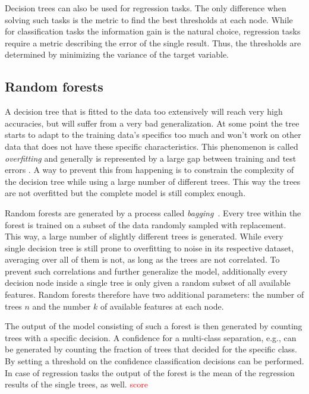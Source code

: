 Decision trees can also be used for regression tasks. The only difference when
solving such tasks is the metric to find the best thresholds at each node.
While for classification tasks the information gain is the natural choice, regression
tasks require a metric describing the error of the single result. Thus, the
thresholds are determined by minimizing the variance of the target variable.

\subsection{Random forests}
%
A decision tree that is fitted to the data too extensively will reach
very high accuracies, but will suffer from a very bad generalization. At some
point the tree starts to adapt to the training data's specifics too much and
won't work on other data that does not have these specific characteristics.
This phenomenon is called \textit{overfitting} and generally is represented by
a large gap between training and test errors \cite{goodfellow}. A way to
prevent this from happening is to constrain the complexity of the decision tree
while using a large number of different trees. This way the trees are not
overfitted but the complete model is still complex enough.

Random forests are generated by a process called
\textit{bagging}~\cite{bagging}. Every tree within the forest is trained on a
subset of the data randomly sampled with replacement. This way, a large number
of slightly different trees is generated. While every single decision tree is
still prone to overfitting to noise in its respective dataset, averaging over
all of them is not, as long as the trees are not correlated. To prevent such
correlations and further generalize the model, additionally every decision node
inside a single tree is only given a random subset of all available features.
Random forests therefore have two additional parameters: the number of trees $n$ and the
number $k$ of available features at each node.

The output of the model consisting of such a forest is then generated
by counting trees with a specific decision. A confidence for a multi-class
separation, e.g., can be generated by counting the fraction of trees that
decided for the specific class. By setting a threshold on the confidence
classification decisions can be performed. In case of regression tasks the
output of the forest is the mean of the regression results of the single trees,
as well. \textcolor{red}{score}


